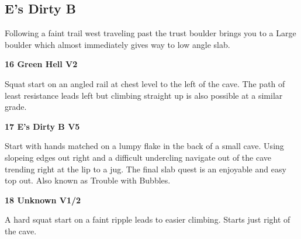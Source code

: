 \begin{multicols}{2}
\begin{adjustwidth}{0.5cm}{}
					
				\end{adjustwidth}
			
		


		\needspace{1.5cm}
		\subsection*{E's Dirty B}\label{bf:E's Dirty B}
		Following a faint trail west traveling past the trust boulder brings you to a Large boulder which almost immediately gives way to low angle slab.\\
	
		
			
			\needspace{1.5cm}
\label{rt:Green Hell}
\colorbox{green!20}{
\parbox{0.95\linewidth}{
\textbf{
16 Green Hell V2  
}}}

			\begin{adjustwidth}{0.5cm}{}			
			Squat start on an angled rail at chest level to the left of the cave. The path of least resistance leads left but climbing straight up is also possible at a similar grade.
			\end{adjustwidth}
			
			
			
			\needspace{1.5cm}
\label{rt:E's Dirty B}
\colorbox{RoyalBlue!20}{
\parbox{0.95\linewidth}{
\textbf{
17 E's Dirty B V5  
}}}

			\begin{adjustwidth}{0.5cm}{}			
			Start with hands matched on a lumpy flake in the back of a small cave. Using slopeing edges out right and a difficult undercling navigate out of the cave trending right at the lip to a jug. The final slab quest is an enjoyable and easy top out. Also known as Trouble with Bubbles.
			\end{adjustwidth}
			
			
			
			\needspace{1.5cm}
\label{rt:Unknown}
\colorbox{green!20}{
\parbox{0.95\linewidth}{
\textbf{
18 Unknown V1/2  
}}}

			\begin{adjustwidth}{0.5cm}{}			
			A hard squat start on a faint ripple leads to easier climbing. Starts just right of the cave.
			\end{adjustwidth}
			
			
		
\label{pt:Fight Club}


\end{multicols}
